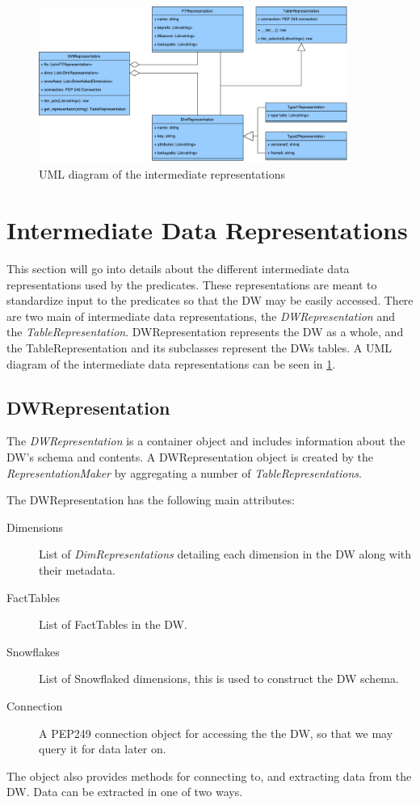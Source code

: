 \begin{figure}
\centering
\includegraphics[width=0.9\textwidth]{figures/dwrep_uml.pdf}
\caption{UML diagram of the intermediate representations}
\label{fig:dwrep}
\end{figure}

\section{Intermediate Data Representations}

This section will go into details about the different intermediate data representations used by the predicates. These representations are meant to standardize input to the predicates so that the DW may be easily accessed. There are two main of intermediate data representations, the \textit{DWRepresentation} and the \textit{TableRepresentation}. DWRepresentation represents the DW as a whole, and the TableRepresentation and its subclasses represent the DWs tables. A UML diagram of the intermediate data representations can be seen in \cref{fig:dwrep}.

\subsection{DWRepresentation}
The \textit{DWRepresentation} is a container object and includes information about the DW's schema and contents. A DWRepresentation object is created by the \textit{RepresentationMaker} by aggregating a number of \textit{TableRepresentations}.

The DWRepresentation has the following main attributes:

\begin{description}
\item[Dimensions] List of \textit{DimRepresentations} detailing each dimension in the DW along with their metadata.
\item[FactTables] List of FactTables in the DW.
\item[Snowflakes] List of Snowflaked dimensions, this is used to construct the DW schema.
\item[Connection] A PEP249 connection object for accessing the the DW, so that we may query it for data later on.
\end{description}
The object also provides methods for connecting to, and extracting data from the DW. Data can be extracted in one of two ways. 


